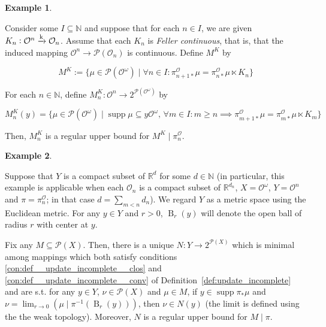 \documentclass[aop,preprint]{imsart}
\numberwithin{equation}{section}
\theoremstyle{definition}
\newtheorem{example}{Example}[section]
\theoremstyle{plain}
\newcommand{\Nats}{\mathbb{N}}
\newcommand{\Reals}{\mathbb{R}}
\newcommand{\B}{\operatorname{B}}
\newcommand{\M}{\xrightarrow{\textnormal{k}}}
\newcommand{\PM}{\mathcal{P}}
\DeclareMathOperator{\Sp}{supp}
\newcommand{\Ob}{\mathcal{O}}
\newcommand{\OO}{\Ob^\omega}
\newcommand{\PO}{\pi^\Ob}
\newcommand{\PMO}{\PM(\OO)}
\begin{document}
\begin{samepage}
\begin{example}
\label{exm:update_incomplete_kernels}

Consider some $I \subseteq \Nats$ and suppose that for each $n \in I$, we are given $K_n: \Ob^n \M \Ob_n$. Assume that each $K_n$ is \emph{Feller continuous}, that is, that the induced mapping $\Ob^n \rightarrow \PM\left(\Ob_n\right)$ is continuous. Define $M^K$ by

\begin{equation}
M^K:=\{\mu \in \PMO \mid \forall n \in I: \PO_{n+1*}\mu = \PO_{n*}\mu \ltimes K_n\}
\end{equation}

For each $n \in \Nats$, define $M^K_n: \Ob^n \rightarrow 2^{\PMO}$ by

\begin{equation}
M^K_n(y) = \{\mu \in \PMO \mid \Sp{\mu} \subseteq y\OO,\, \forall m \in I: m \geq n \implies \PO_{m+1*}\mu = \PO_{m*}\mu \ltimes K_m\}
\end{equation}

Then, $M^K_n$ is a regular upper bound for $M^K \mid \PO_n$.

\end{example}
\end{samepage}

\begin{samepage}
\begin{example}
\label{exm:update_incomplete_euclid}

Suppose that $Y$ is a compact subset of $\Reals^{d}$ for some $d \in \Nats$ (in particular, this example is applicable when each $\Ob_n$ is a compact subset of $\Reals^{d_n}$, $X=\OO$, $Y=\Ob^n$ and $\pi=\PO_n$; in that case $d=\sum_{m < n} d_n$). We regard $Y$ as a metric space using the Euclidean metric. For any $y \in Y$ and $r > 0$, $\B_r\left(y\right)$ will denote the open ball of radius $r$ with center at $y$. 

Fix any $M \subseteq \PM(X)$. Then, there is a unique $N: Y \rightarrow 2^{\PM(X)}$ which is minimal among mappings which both satisfy conditions \ref{con:def__update_incomplete__clos} and \ref{con:def__update_incomplete__conv} of Definition~\ref{def:update_incomplete} and are s.t. for any $y \in Y$, $\nu \in \PM(X)$ and $\mu \in M$, if $y \in \Sp \pi_*\mu$ and $\nu = \lim_{r \rightarrow 0}{\left(\mu \mid \pi^{-1}\left(\B_r\left(y\right)\right)\right)}$, then $\nu \in N(y)$ (the limit is defined using the the weak topology). Moreover, $N$ is a regular upper bound for $M \mid \pi$.

\end{example}
\end{samepage}
\end{document}
